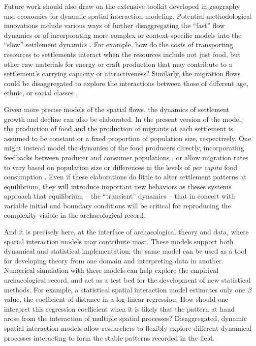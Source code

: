 \documentclass{article}
\begin{document}
Future work should also draw on the extensive toolkit developed in geography and economics for dynamic spatial interaction modeling. Potential methodological innovations include various ways of further disaggregating the ``fast'' flow dynamics or of incorporating more complex or context-specific models into the ``slow'' settlement dynamics \parencite{Fry2012}. For example, how do the costs of transporting resources to settlements interact when the resources include not just food, but other raw materials for energy or craft production that may contribute to a settlement's carrying capacity or attractiveness? Similarly, the migration flows could be disaggregated to explore the interactions between those of different age, ethnic, or social classes \parencite{Altaweel2015}. 

Given more precise models of the spatial flows, the dynamics of settlement growth and decline can also be elaborated. In the present version of the model, the production of food and the production of migrants at each settlement is assumed to be constant or a fixed proportion of population size, respectively. One might instead model the dynamics of the food producers directly, incorporating feedbacks between producer and consumer populations \parencite{Turchin2003}, or allow migration rates to vary based on population size \parencite{Curiel2018} or differences in the levels of \emph{per capita} food consumption \parencite{Anderies2011a}. Even if these elaborations do little to alter settlement patterns at equilibrium, they will introduce important new behaviors as theses systems approach that equilibrium -- the ``transient'' dynamics -- that in concert with variable initial and boundary conditions will be critical for reproducing the complexity visible in the archaeological record.

And it is precisely here, at the interface of archaeological theory and data, where spatial interaction models may contribute most. These models support both dynamical and statistical implementation; the same model can be used as a tool for developing theory from one domain and interpreting data in another. Numerical simulation with these models can help explore the empirical archaeological record, and act as a test bed for the development of new statistical methods. For example, a statistical spatial interaction model estimates only one $\beta$ value, the coefficient of distance in a log-linear regression. How should one interpret this regression coefficient when it is likely that the pattern at hand arose from the interaction of multiple spatial processes? Disaggregated, dynamic spatial interaction models allow researchers to flexibly explore different dynamical processes interacting to form the stable patterns recorded in the field.
\end{document}
